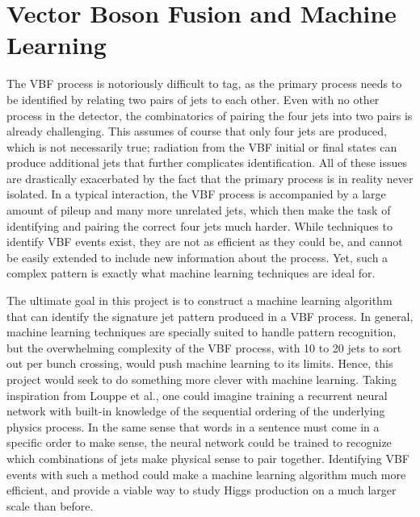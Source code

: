 \documentclass[12pt,letterpaper]{article}
\begin{document}
\section*{Vector Boson Fusion and Machine Learning}
    The VBF process is notoriously difficult to tag, as the primary process needs to be identified by relating two pairs of jets to each other. Even with no other process in the detector, the combinatorics of pairing the four jets into two pairs is already challenging. This assumes of course that only four jets are produced, which is not necessarily true; radiation from the VBF initial or final states can produce additional jets that further complicates identification. All of these issues are drastically exacerbated by the fact that the primary process is in reality never isolated. In a typical interaction, the VBF process is accompanied by a large amount of pileup and many more unrelated jets, which then make the task of identifying and pairing the correct four jets much harder. While techniques to identify VBF events exist, they are not as efficient as they could be, and cannot be easily extended to include new information about the process. Yet, such a complex pattern is exactly what machine learning techniques are ideal for.


    The ultimate goal in this project is to construct a machine learning algorithm that can identify the signature jet pattern produced in a VBF process. In general, machine learning techniques are specially suited to handle pattern recognition, but the overwhelming complexity of the VBF process, with 10 to 20 jets to sort out per bunch crossing, would push machine learning to its limits. Hence, this project would seek to do something more clever with machine learning. Taking inspiration from Louppe et al.\cite{Louppe:2017ipp}, one could imagine training a recurrent neural network with built-in knowledge of the sequential ordering of the underlying physics process. In the same sense that words in a sentence must come in a specific order to make sense, the neural network could be trained to recognize which combinations of jets make physical sense to pair together. Identifying VBF events with such a method could make a machine learning algorithm much more efficient, and provide a viable way to study Higgs production on a much larger scale than before.
\end{document}
